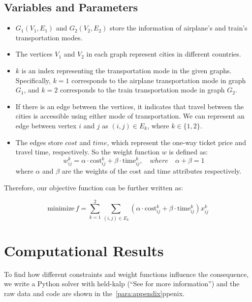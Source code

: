 \documentclass{article} %
\begin{document}
\subsection*{Variables and Parameters}
\begin{itemize}
  \item $G_1(V_1, E_1)$ and $G_2(V_2, E_2)$ store the information of airplane's and train's transportation modes.
  \item The vertices $V_1$ and $V_2$ in each graph represent cities in different
        countries.
  \item $k$ is an index representing the transportation mode in the given graphs. Specifically, $k = 1$ corresponds to the airplane transportation mode in graph $G_1$, and $k = 2$ corresponds to the train transportation mode in graph $G_2$.
  \item If there is an edge between the vertices, it indicates that travel between the
        cities is accessible using either mode of transportation. We can represent an
        edge between vertex $i$ and $j$ as $(i, j) \in E_k$, where $k \in \{1, 2\}$.
  \item The edges store $cost$ and $time$, which represent the one-way ticket price and
        travel time, respectively. So the weight function $w$ is defined as:
        \begin{equation*}
          w_{ij}^k = \alpha \cdot \text{cost}_{ij}^k + \beta \cdot \text{time}_{ij}^k, \quad where \quad \alpha + \beta = 1
        \end{equation*}
        where $\alpha$ and $\beta$ are the weights of the cost and time attributes
        respectively.

\end{itemize}
Therefore, our objective function can be further written as:

\begin{equation*}
  \text{minimize}\, f = \sum_{k=1}^{2} \sum_{(i,j) \in E_k} (\alpha \cdot \text{cost}_{ij}^k + \beta \cdot \text{time}_{ij}^k) x_{ij}^k
\end{equation*}

\section{Computational Results}
To find how different constraints and weight functions influence the consequence, we write a Python solver with held-kalp (``See \citet{doi:10.1137/0110015} for more information'') and the raw data and code are shown in the~\ref{para:appendix}ppenix. 
\end{document}
